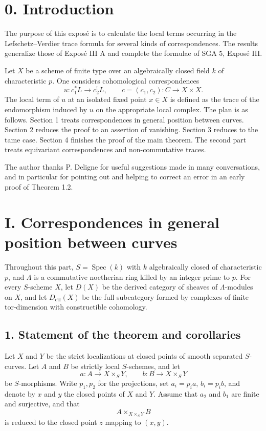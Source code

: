 \documentclass[11pt]{article}
\theoremstyle{plain}
\theoremstyle{definition}
\theoremstyle{remark}
\DeclareMathOperator{\Spec}{Spec}
\begin{document}
\section*{0. Introduction}
The purpose of this exposé is to calculate the local terms occurring in the Lefschetz--Verdier trace formula for several kinds of correspondences. The results generalize those of Exposé III A and complete the formulae of SGA 5, Exposé III.

Let $X$ be a scheme of finite type over an algebraically closed field $k$ of characteristic $p$. One considers cohomological correspondences
\[
   u:c_1^*L\to c_2^!L,
   \qquad
   c=(c_1,c_2):C\to X\times X.
\]
The local term of $u$ at an isolated fixed point $x\in X$ is defined as the trace of the endomorphism induced by $u$ on the appropriate local complex. The plan is as follows. Section 1 treats correspondences in general position between curves. Section 2 reduces the proof to an assertion of vanishing. Section 3 reduces to the tame case. Section 4 finishes the proof of the main theorem. The second part treats equivariant correspondences and non-commutative traces.

The author thanks P. Deligne for useful suggestions made in many conversations, and in particular for pointing out and helping to correct an error in an early proof of Theorem 1.2.

\section*{I. Correspondences in general position between curves}

Throughout this part, $S=\Spec(k)$ with $k$ algebraically closed of characteristic $p$, and $\Lambda$ is a commutative noetherian ring killed by an integer prime to $p$. For every $S$-scheme $X$, let $D(X)$ be the derived category of sheaves of $\Lambda$-modules on $X$, and let $D_{\mathrm{ctf}}(X)$ be the full subcategory formed by complexes of finite tor-dimension with constructible cohomology.

\subsection*{1. Statement of the theorem and corollaries}
Let $X$ and $Y$ be the strict localizations at closed points of smooth separated $S$-curves. Let $A$ and $B$ be strictly local $S$-schemes, and let
\[
   a:A\to X\times_S Y,
   \qquad
   b:B\to X\times_S Y
\]
be $S$-morphisms. Write $p_1,p_2$ for the projections, set $a_i=p_ia$, $b_i=p_ib$, and denote by $x$ and $y$ the closed points of $X$ and $Y$. Assume that $a_2$ and $b_1$ are finite and surjective, and that
\[
   A\times_{X\times_SY}B
\]
is reduced to the closed point $z$ mapping to $(x,y)$.
\end{document}
